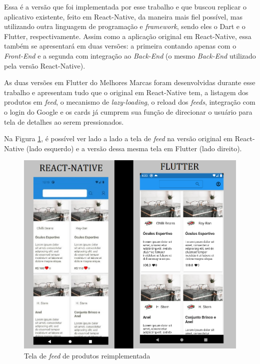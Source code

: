 \documentclass[12pt]{article}
\begin{document}
Essa é a versão que foi implementada por esse trabalho e que buscou replicar o aplicativo existente, feito em React-Native, da maneira mais fiel possível, mas utilizando outra linguagem de programação e \textit{framework}, sendo eles o Dart e o Flutter, respectivamente. Assim como a aplicação original em React-Native, essa também se apresentará em duas versões: a primeira contando apenas com o \textit{Front-End} e a segunda com integração ao \textit{Back-End} (o mesmo \textit{Back-End} utilizado pela versão React-Native). 

As duas versões em Flutter do Melhores Marcas foram desenvolvidas durante esse trabalho e apresentam tudo que o original em React-Native tem, a listagem dos produtos em \textit{feed}, o mecanismo de \textit{lazy-loading}, o reload dos \textit{feeds}, integração com o login do Google e os cards já cumprem sua função de direcionar o usuário para tela de detalhes ao serem pressionados.

Na Figura \ref{fig:comp1}, é possível ver lado a lado a tela de \textit{feed} na versão original em React-Native (lado esquerdo) e a versão dessa mesma tela em Flutter (lado direito).

\begin{figure}[ht!]
\centering
\includegraphics[width=1.0\textwidth]{imagens/compfeeds.png}
\caption{Tela de \textit{feed} de produtos reimplementada}
\label{fig:comp1}
\end{figure}
\end{document}

